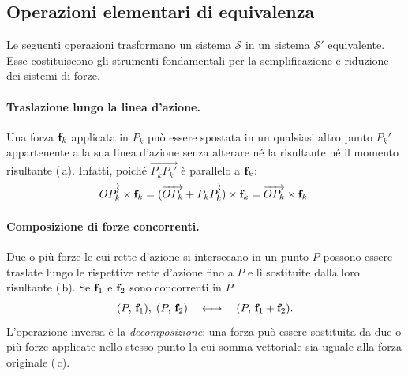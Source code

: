 \subsection{Operazioni elementari di equivalenza}

Le seguenti operazioni trasformano un sistema $\mathcal{S}$ in
un sistema $\mathcal{S}'$ equivalente. Esse costituiscono gli
strumenti fondamentali per la semplificazione e riduzione dei
sistemi di forze.

\paragraph{Traslazione lungo la linea d'azione.}
Una forza $\mathbf{f}_k$ applicata in $P_k$ può essere spostata in un
qualsiasi altro punto $P_k'$ appartenente alla sua linea
d'azione senza alterare né la risultante né il momento
risultante (\,a). Infatti, poiché $\overrightarrow{P_k P_k'}$ è
parallelo a $\mathbf{f}_k$:
\begin{equation}
	\overrightarrow{OP_k'} \times \mathbf{f}_k
	= (\overrightarrow{OP_k}
	+ \overrightarrow{P_k P_k'}) \times \mathbf{f}_k
	= \overrightarrow{OP_k} \times \mathbf{f}_k.
\end{equation}

\paragraph{Composizione di forze concorrenti.}
Due o più forze le cui rette d'azione si intersecano in un
punto $P$ possono essere traslate lungo le rispettive rette
d'azione fino a $P$ e lì sostituite dalla loro risultante (\,b). Se
$\mathbf{f}_1$ e $\mathbf{f}_2$ sono concorrenti in $P$:
\begin{equation}
	(P,\,\mathbf{f}_1),\;(P,\,\mathbf{f}_2)
	\quad\longleftrightarrow\quad
	(P,\,\mathbf{f}_1+\mathbf{f}_2).
\end{equation}
L'operazione inversa è la \textit{decomposizione}: una forza
può essere sostituita da due o più forze applicate nello stesso
punto la cui somma vettoriale sia uguale alla forza originale (\,c).

